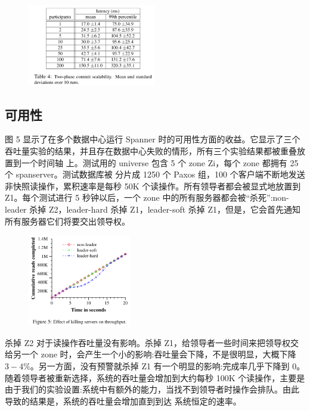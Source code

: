 \documentclass[letterpaper,twocolumn,10pt]{article}
\begin{document}
\begin{figure}[htbp]
\begin{center}
\includegraphics[width=0.5\textwidth]{./table_4.png}
\label{Table4}
\end{center}
\end{figure}

\subsection{可用性}
图 5 显示了在多个数据中心运行 Spanner 时的可用性方面的收益。它显示了三个吞吐量实验的结果，并且存在数据中心失败的情形，所有三个实验结果都被重叠放置到一个时间轴 上。测试用的 universe 包含 5 个 zone Zi，每个 zone 都拥有 25 个 spanserver。测试数据库被 分片成 1250 个 Paxos 组，100 个客户端不断地发送非快照读操作，累积速率是每秒 50K 个读操作。所有领导者都会被显式地放置到 Z1。每个测试进行 5 秒钟以后，一个 zone 中的所有服务器都会被“杀死”:non-leader 杀掉 Z2，leader-hard 杀掉 Z1，leader-soft 杀掉 Z1，但是，它会首先通知所有服务器它们将要交出领导权。

\begin{figure}[htbp]
\begin{center}
\includegraphics[width=0.4\textwidth]{./fig_5.png}
\label{Fig5}
\end{center}
\end{figure}

杀掉 Z2 对于读操作吞吐量没有影响。杀掉 Z1，给领导者一些时间来把领导权交给另一个 zone 时，会产生一个小的影响:吞吐量会下降，不是很明显，大概下降 $3-4\%$。另一方面，没有预警就杀掉 Z1 有一个明显的影响:完成率几乎下降到 0。随着领导者被重新选择，系统的吞吐量会增加到大约每秒 100K 个读操作，主要是由于我们的实验设置:系统中有额外的能力，当找不到领导者时操作会排队。由此导致的结果是，系统的吞吐量会增加直到到达 系统恒定的速率。
\end{document}
